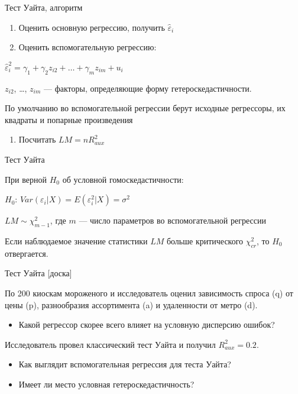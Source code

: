 \documentclass[ignorenonframetext,]{beamer}
\newcommand{\e}{\varepsilon}
\begin{document}
\begin{frame}{Тест Уайта, алгоритм}

\begin{enumerate}
\def\labelenumi{\arabic{enumi}.}
\item
  Оценить основную регрессию, получить \(\hat{\varepsilon}_i\)
\item
  Оценить вспомогательную регрессию:
\end{enumerate}

\(\hat{\varepsilon}^2_i = \gamma_1 + \gamma_2 z_{i2} + \ldots + \gamma_{m} z_{im}+ u_i\)

\(z_{i2}\), \ldots, \(z_{im}\) --- факторы, определяющие форму
гетероскедастичности.

По умолчанию во вспомогательной регрессии берут исходные регрессоры, их
квадраты и попарные произведения

\begin{enumerate}
\def\labelenumi{\arabic{enumi}.}
\setcounter{enumi}{2}
\itemsep1pt\parskip0pt
\item
  Посчитать \(LM=nR^2_{aux}\)
\end{enumerate}

\end{frame}

\begin{frame}{Тест Уайта}

При верной \(H_0\) об условной гомоскедастичности:

\(H_0\): \(Var(\e_i|X)=E(\varepsilon^2_i|X)=\sigma^2\)

\(LM \sim \chi^2_{m-1}\), где \(m\) --- число параметров во
вспомогательной регрессии

Если наблюдаемое значение статистики \(LM\) больше критического
\(\chi^2_{cr}\), то \(H_0\) отвергается.

\end{frame}

\begin{frame}{Тест Уайта {[}доска{]}}

По 200 киоскам мороженого и исследователь оценил зависимость спроса (q)
от цены (p), разнообразия ассортимента (a) и удаленности от метро (d).

\begin{itemize}
\itemsep1pt\parskip0pt
\item
  Какой регрессор скорее всего влияет на условную дисперсию ошибок?
\end{itemize}

Исследователь провел классический тест Уайта и получил
\(R^2_{aux}=0.2\).

\begin{itemize}
\item
  Как выглядит вспомогательная регрессия для теста Уайта?
\item
  Имеет ли место условная гетероскедастичность?
\end{itemize}

\end{frame}
\end{document}
